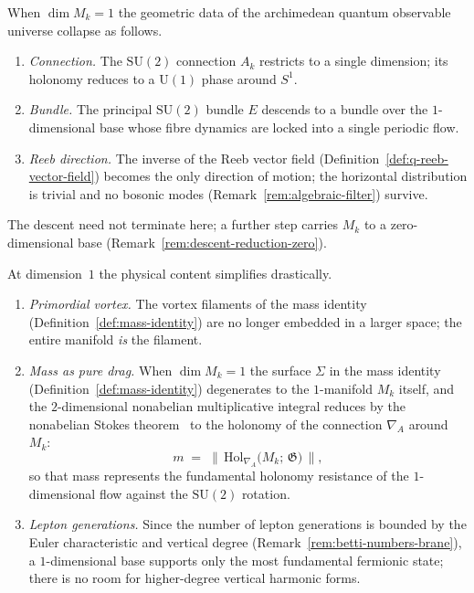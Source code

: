 \begin{remark}
\label{rem:descent-reduction}
When $\dim M_k = 1$ the geometric data of the archimedean quantum observable
universe collapse as follows.
\begin{enumerate}
  \item \emph{Connection.}  The $\mathrm{SU}(2)$ connection $A_k$ restricts to
        a single dimension; its holonomy reduces to a $\mathrm{U}(1)$ phase
        around $S^1$.
  \item \emph{Bundle.}  The principal $\mathrm{SU}(2)$ bundle $E$ descends to a
        bundle over the $1$-dimensional base whose fibre dynamics are locked
        into a single periodic flow.
  \item \emph{Reeb direction.}  The inverse of the Reeb vector field
        (Definition~\ref{def:q-reeb-vector-field}) becomes the only direction
        of motion; the horizontal distribution is trivial and no bosonic modes
        (Remark~\ref{rem:algebraic-filter}) survive.
\end{enumerate}
The descent need not terminate here; a further step carries $M_k$ to a
zero-dimensional base (Remark~\ref{rem:descent-reduction-zero}).
\end{remark}

\begin{remark}
\label{rem:descent-physical}
At dimension~$1$ the physical content simplifies drastically.
\begin{enumerate}
  \item \emph{Primordial vortex.}  The vortex filaments of the mass identity
        (Definition~\ref{def:mass-identity}) are no longer embedded in a larger
        space; the entire manifold \emph{is} the filament.
  \item \emph{Mass as pure drag.}  When $\dim M_k = 1$ the surface
        $\Sigma$ in the mass identity
        (Definition~\ref{def:mass-identity}) degenerates to the
        $1$-manifold $M_k$ itself, and the $2$-dimensional nonabelian
        multiplicative integral reduces by the nonabelian Stokes
        theorem~\cite{yekutieli2015} to the holonomy of the connection
        $\nabla_A$ around~$M_k$:
        \[
          m \;=\;
          \bigl\lVert\,
          \mathrm{Hol}_{\nabla_A}\!\bigl(M_k;\, \mathfrak{G}\bigr)
          \,\bigr\rVert,
        \]
        so that mass represents the fundamental holonomy resistance of
        the $1$-dimensional flow against the $\mathrm{SU}(2)$ rotation.
  \item \emph{Lepton generations.}  Since the number of lepton generations is
        bounded by the Euler characteristic and vertical degree
        (Remark~\ref{rem:betti-numbers-brane}), a $1$-dimensional base supports
        only the most fundamental fermionic state; there is no room for
        higher-degree vertical harmonic forms.
\end{enumerate}
\end{remark}

